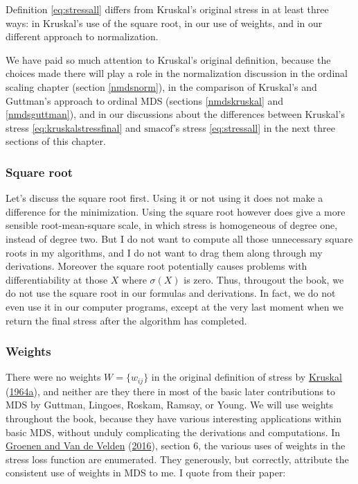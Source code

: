 \documentclass[
  12pt,
]{book}
\theoremstyle{definition}
\theoremstyle{definition}
\theoremstyle{definition}
\theoremstyle{definition}
\theoremstyle{remark}
\begin{document}
Definition \eqref{eq:stressall} differs from Kruskal's original stress in at least three ways: in Kruskal's use of the square root, in our use of weights, and in our different approach to normalization.

We have paid so much attention to Kruskal's original definition, because
the choices made there will play a role in the normalization discussion
in the ordinal scaling chapter (section \ref{nmdsnorm}), in the
comparison of Kruskal's and Guttman's approach to ordinal MDS (sections \ref{nmdskruskal} and \ref{nmdsguttman}), and in our discussions about the
differences between Kruskal's stress \eqref{eq:kruskalstressfinal} and
\(\textrm{smacof}\)'s stress \eqref{eq:stressall} in the next three sections of this chapter.

\hypertarget{square-root}{%
\subsubsection{Square root}\label{square-root}}

Let's discuss the square root first. Using it or not using it
does not make a difference for the minimization. Using the square root however does give a more sensible root-mean-square scale, in which stress is homogeneous of degree one, instead of degree two. But I do not want to compute
all those unnecessary square roots in my algorithms, and I do not want to drag them along through my derivations. Moreover the square root potentially causes problems with differentiability at those \(X\) where \(\sigma(X)\) is zero. Thus, througout the book, we do not use the square root in our formulas and derivations. In fact, we do not even use it in our computer programs, except at the very last moment when we return the final stress after the algorithm has completed.

\hypertarget{bweights}{%
\subsubsection{Weights}\label{bweights}}

There were no weights \(W=\{w_{ij}\}\) in the original definition of stress by \protect\hyperlink{ref-kruskal_64a}{Kruskal} (\protect\hyperlink{ref-kruskal_64a}{1964a}), and neither are they there in most of the basic later contributions to MDS by Guttman, Lingoes, Roskam, Ramsay, or Young. We will use weights throughout the book, because they have various interesting applications within basic MDS, without unduly complicating the derivations and computations. In \protect\hyperlink{ref-groenen_vandevelden_16}{Groenen and Van de Velden} (\protect\hyperlink{ref-groenen_vandevelden_16}{2016}), section 6, the various uses of weights in the stress loss function are enumerated. They generously, but correctly, attribute the consistent use of weights in MDS to me. I quote from their paper:
\end{document}
